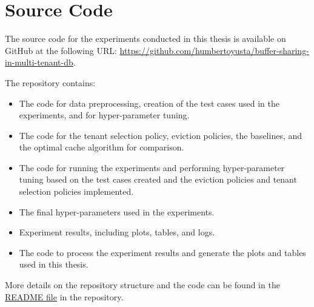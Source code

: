 \chapter{Source Code}
\label{appendix:source-code}

The source code for the experiments conducted in this thesis is available on GitHub at the 
following URL: \url{https://github.com/humbertoyusta/buffer-sharing-in-multi-tenant-db}.

The repository contains:

\begin{itemize}
  \item The code for data preprocessing, creation of the test cases used in the experiments, 
  and for hyper-parameter tuning.
  \item The code for the tenant selection policy, eviction policies, the baselines, and the 
  optimal cache algorithm for comparison.
  \item The code for running the experiments and performing hyper-parameter tuning based on 
  the test cases created and the eviction policies and tenant selection policies implemented.
  \item The final hyper-parameters used in the experiments.
  \item Experiment results, including plots, tables, and logs.
  \item The code to process the experiment results and generate the plots and tables used in 
  this thesis.
\end{itemize}

More details on the repository structure and the code can be found in the 
\href{https://github.com/humbertoyusta/buffer-sharing-in-multi-tenant-db/blob/main/README.md}{README file}
in the repository.